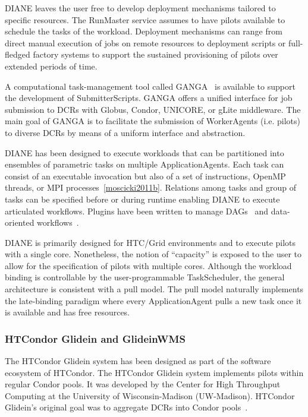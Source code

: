 \documentclass{sig-alternate}
\begin{document}
DIANE leaves the user free to develop deployment mechanisms tailored to specific
resources. The RunMaster service assumes to have pilots available to schedule
the tasks of the workload. Deployment mechanisms can range from direct manual
execution of jobs on remote resources to deployment scripts or full-fledged
factory systems to support the sustained provisioning of pilots over extended
periods of time.

A computational task-management tool called
GANGA~\cite{moscicki2009ganga,ganga_url} is available to support the development
of SubmitterScripts. GANGA offers a unified interface for job submission to DCRs
with Globus, Condor, UNICORE, or gLite middleware. The main goal of GANGA is to
facilitate the submission of WorkerAgents (i.e. pilots) to diverse DCRs by means
of a uniform interface and abstraction.

DIANE has been designed to execute workloads that can be partitioned into
ensembles of parametric tasks on multiple ApplicationAgents. Each task can
consist of an executable invocation but also of a set of instructions, OpenMP
threads, or MPI processes~\ref{moscicki2011b}. Relations among tasks and group
of tasks can be specified before or during runtime enabling DIANE to execute
articulated workflows. Plugins have been written to manage
DAGs~\cite{grzeslo2009} and data-oriented workflows~\cite{glatard2008}.

DIANE is primarily designed for HTC/Grid environments and to execute pilots with
a single core. Nonetheless, the notion of ``capacity'' is exposed to the user to
allow for the specification of pilots with multiple cores. Although the workload
binding is controllable by the user-programmable TaskScheduler, the general
architecture is consistent with a pull model. The pull model naturally
implements the late-binding paradigm where every ApplicationAgent pulls a new
task once it is available and has free resources.

%
\subsubsection{HTCondor Glidein and GlideinWMS}
\label{sec:glidein}

The HTCondor Glidein system has been designed as part of the software ecosystem
of HTCondor. The HTCondor Glidein system implements pilots within regular Condor
pools.  It was developed by the Center for High Throughput Computing at the
University of Wisconsin-Madison (UW-Madison).  HTCondor Glidein's original goal
was to aggregate DCRs into Condor pools~\cite{glidein_manual_url}.
\end{document}

